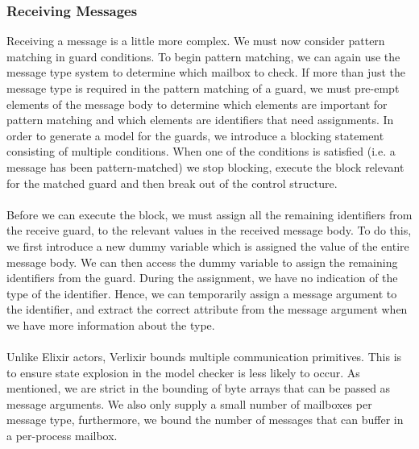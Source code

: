 \subsubsection{Receiving Messages}
Receiving a message is a little more complex. We must now consider pattern matching in guard conditions. To begin pattern matching, we can again use the message type system to determine which mailbox to check. If more than just the message type is required in the pattern matching of a guard, we must pre-empt elements of the message body to determine which elements are important for pattern matching and which elements are identifiers that need assignments. In order to generate a model for the guards, we introduce a blocking statement consisting of multiple conditions. When one of the conditions is satisfied (i.e. a message has been pattern-matched) we stop blocking, execute the block relevant for the matched guard and then break out of the control structure. \\ \\
Before we can execute the block, we must assign all the remaining identifiers from the receive guard, to the relevant values in the received message body. To do this, we first introduce a new dummy variable which is assigned the value of the entire message body. We can then access the dummy variable to assign the remaining identifiers from the guard. During the assignment, we have no indication of the type of the identifier. Hence, we can temporarily assign a message argument to the identifier, and extract the correct attribute from the message argument when we have more information about the type.
\\ \\
Unlike Elixir actors, Verlixir bounds multiple communication primitives. This is to ensure state explosion in the model checker is less likely to occur. As mentioned, we are strict in the bounding of byte arrays that can be passed as message arguments. We also only supply a small number of mailboxes per message type, furthermore, we bound the number of messages that can buffer in a per-process mailbox.
